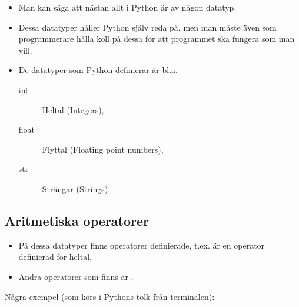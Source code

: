 \documentclass{beamer}
\begin{document}
\begin{frame}{\insertsubsectionhead}
  \begin{itemize}
    \item Man kan säga att nästan allt i Python är av någon datatyp.

    \item Dessa datatyper håller Python själv reda på, men man måste även som 
      programmerare hålla koll på dessa för att programmet ska fungera som man 
      vill.

    \item De datatyper som Python definierar är bl.a.
      \begin{description}
        \item[int] Heltal (Integers),
        \item[float] Flyttal (Floating point numbers),
        \item[str] Strängar (Strings).
      \end{description}
  \end{itemize}
\end{frame}


\subsection{Aritmetiska operatorer}

\begin{frame}{\insertsubsectionhead}
  \begin{itemize}
    \item På dessa datatyper finns operatorer definierade, t.ex. \code{+} är en 
      operator definierad för heltal.

    \item Andra operatorer som finns är \code{+ - * / // \%}.

  \end{itemize}
\end{frame}

\begin{frame}[fragile]{\insertsubsectionhead}
  Några exempel (som körs i Pythons tolk från terminalen):
\end{frame}
\end{document}
